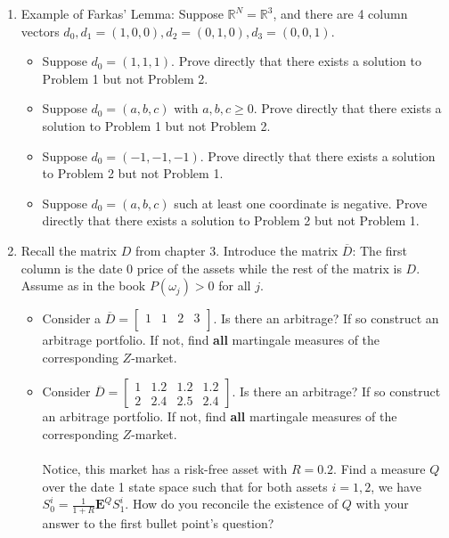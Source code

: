 \documentclass[12pt]{article}
\renewcommand{\o}{\omega}
\newcommand{\R}{\mathbb{R}}
\newcommand{\ol}{\overline}
\begin{document}
\begin{enumerate}
  \item Example of Farkas' Lemma: Suppose $\R^N = \R^3$, and there are 4 column vectors $d_0, d_1 = (1, 0, 0), d_2 = (0, 1, 0), d_3 = (0, 0, 1)$.
  \begin{itemize}
    \item Suppose $d_0 = (1, 1, 1)$. Prove directly that there exists a solution to Problem 1 but not Problem 2.
    \item Suppose $d_0 = (a, b, c)$ with $a, b, c \geq 0$. Prove directly that there exists a solution to Problem 1 but not Problem 2.
    \item Suppose $d_0 = (-1, -1, -1)$. Prove directly that there exists a solution to Problem 2 but not Problem 1.
    \item Suppose $d_0 = (a, b, c)$ such at least one coordinate is negative. Prove directly that there exists a solution to Problem 2 but not Problem 1.
  \end{itemize}
  \item Recall the matrix $D$ from chapter 3. Introduce the matrix $\ol{D}$: The first column is the date 0 price of the assets while the rest of the matrix is $D$. Assume as in the book $P(\o_j) > 0$ for all $j$.
  \begin{itemize}
    \item Consider a $\ol{D}=
    \left[\begin{array}{llll}
    1 & 1 & 2 & 3\\
    \end{array}
    \right].$ Is there an arbitrage? If so construct an arbitrage portfolio. If not, find \textbf{all} martingale measures of the corresponding $Z$-market.
    \item Consider $\ol{D}=
    \left[\begin{array}{llll}
    1 & 1.2 & 1.2 & 1.2 \\
    2 & 2.4 & 2.5 & 2.4
    \end{array}
    \right]$. Is there an arbitrage? If so construct an arbitrage portfolio. If not, find \textbf{all} martingale measures of the corresponding $Z$-market.
    \\
    \\
    Notice, this market has a risk-free asset with $R = 0.2$. Find a measure $Q$ over the date 1 state space such that for both assets $i = 1, 2$, we have $S_0^i = \frac{1}{1+R} \mathbf{E}^Q S_1^i$. How do you reconcile the existence of $Q$ with your answer to the first bullet point's question?
  \end{itemize}

\end{enumerate}
\end{document}
